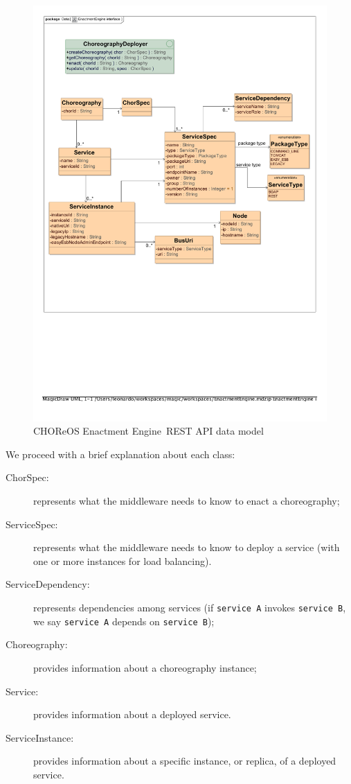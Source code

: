 \documentclass[a4paper, 10pt]{article}
\newcommand{\ee}{CHOReOS Enactment Engine}
\begin{document}
\begin{figure}
\centering
\includegraphics[scale=0.75]{img/data_model.pdf}
\caption{\ee\ REST API data model}
\label{img:data_model}
\end{figure}

We proceed with a brief explanation about each class:

\begin{description}
\item [ChorSpec:] represents what the middleware needs to know to enact a choreography;
\item [ServiceSpec:] represents what the middleware needs to know to deploy a service (with one or more instances for load balancing).
\item [ServiceDependency:] represents dependencies among services (if \verb!service A! invokes \verb!service B!, we say \verb!service A! depends on \verb!service B!);
\item [Choreography:] provides information about a choreography instance; 
\item [Service:] provides information about a deployed service. 
\item [ServiceInstance:] provides information about a specific instance, or replica, of a deployed service. 
\end{description}
\end{document}
